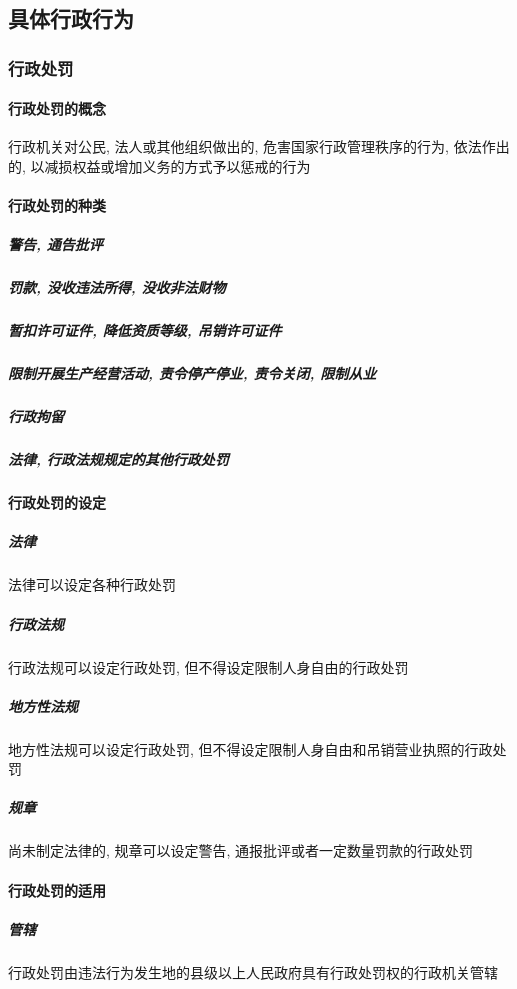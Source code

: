 \subsection{具体行政行为}

\subsubsection{行政处罚}

\paragraph{行政处罚的概念} 行政机关对公民, 法人或其他组织做出的, 危害国家行政管理秩序的行为, 依法作出的, 以减损权益或增加义务的方式予以惩戒的行为

\paragraph{行政处罚的种类} 

\subparagraph{警告, 通告批评}

\subparagraph{罚款, 没收违法所得, 没收非法财物}

\subparagraph{暂扣许可证件, 降低资质等级, 吊销许可证件}

\subparagraph{限制开展生产经营活动, 责令停产停业, 责令关闭, 限制从业}

\subparagraph{行政拘留}

\subparagraph{法律, 行政法规规定的其他行政处罚}

\paragraph{行政处罚的设定}

\subparagraph{法律} 法律可以设定各种行政处罚

\subparagraph{行政法规} 行政法规可以设定行政处罚, 但不得设定限制人身自由的行政处罚

\subparagraph{地方性法规} 地方性法规可以设定行政处罚, 但不得设定限制人身自由和吊销营业执照的行政处罚

\subparagraph{规章} 尚未制定法律的, 规章可以设定警告, 通报批评或者一定数量罚款的行政处罚

\paragraph{行政处罚的适用}

\subparagraph{管辖} 行政处罚由违法行为发生地的县级以上人民政府具有行政处罚权的行政机关管辖


